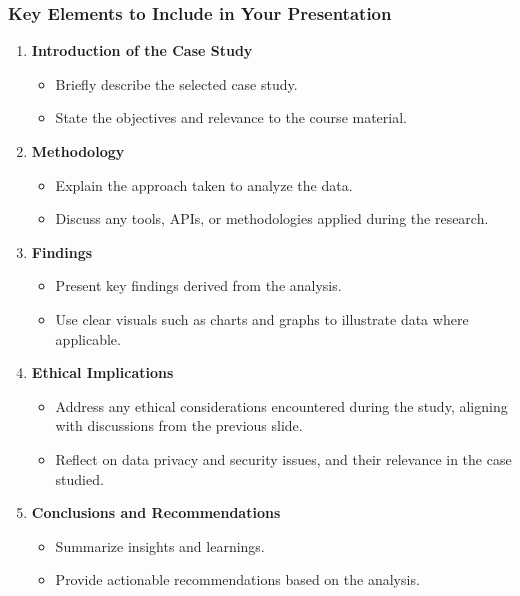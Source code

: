 \documentclass[aspectratio=169]{beamer}
\begin{document}
\begin{frame}[fragile]
    \frametitle{Key Elements to Include in Your Presentation}
    \begin{enumerate}
        \item \textbf{Introduction of the Case Study}
        \begin{itemize}
            \item Briefly describe the selected case study.
            \item State the objectives and relevance to the course material.
        \end{itemize}
        
        \item \textbf{Methodology}
        \begin{itemize}
            \item Explain the approach taken to analyze the data.
            \item Discuss any tools, APIs, or methodologies applied during the research.
        \end{itemize}
        
        \item \textbf{Findings}
        \begin{itemize}
            \item Present key findings derived from the analysis.
            \item Use clear visuals such as charts and graphs to illustrate data where applicable.
        \end{itemize}
        
        \item \textbf{Ethical Implications}
        \begin{itemize}
            \item Address any ethical considerations encountered during the study, aligning with discussions from the previous slide.
            \item Reflect on data privacy and security issues, and their relevance in the case studied.
        \end{itemize}
        
        \item \textbf{Conclusions and Recommendations}
        \begin{itemize}
            \item Summarize insights and learnings.
            \item Provide actionable recommendations based on the analysis.
        \end{itemize}
    \end{enumerate}
\end{frame}
\end{document}
